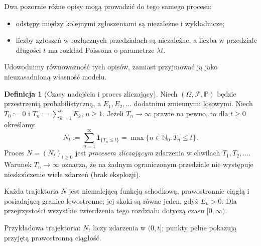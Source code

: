 \documentclass[11pt,a4paper,oneside]{report}
\numberwithin{equation}{chapter}
\theoremstyle{plain}
\theoremstyle{definition}
\newtheorem{definicja}{Definicja}[chapter]
\theoremstyle{remark}
\newcommand{\N}{\mathbb{N}}
\newcommand{\Prob}{\mathbb{P}}
\newcommand{\calF}{\mathcal{F}}
\newcommand{\ind}[1]{\mathbf{1}_{#1}}
\begin{document}
Dwa pozornie różne opisy mogą prowadzić do tego samego procesu:
\begin{itemize}
\item odstępy między kolejnymi zgłoszeniami są niezależne i wykładnicze;
\item liczby zgłoszeń w rozłącznych przedziałach są niezależne, a liczba
w przedziale długości $t$ ma rozkład Poissona o parametrze $\lambda t$.
\end{itemize}
Udowodnimy równoważność tych opisów, zamiast przyjmować ją jako
nieuzasadnioną własność modelu.

\begin{definicja}[Czasy nadejścia i proces zliczający]
Niech $(\Omega,\calF,\Prob)$ będzie przestrzenią probabilistyczną,
a $E_1,E_2,\ldots$ dodatnimi zmiennymi losowymi. Niech
$T_0:=0$ i $T_n:=\sum_{k=1}^n E_k$, $n\ge1$.
Jeżeli $T_n\to\infty$ prawie na pewno, to dla $t\ge0$ określamy
\[
N_t:=\sum_{n=1}^\infty\ind{\{T_n\le t\}}
      =\max\{n\in\N_0:T_n\le t\}.
\]
Proces $N=(N_t)_{t\ge0}$ jest \emph{procesem zliczającym} zdarzenia
w chwilach $T_1,T_2,\ldots$. Warunek $T_n\to\infty$ oznacza, że na
żadnym ograniczonym przedziale nie występuje nieskończenie wiele
zdarzeń (brak eksplozji).
\end{definicja}

Każda trajektoria $N$ jest niemalejącą funkcją schodkową, prawostronnie
ciągłą i posiadającą granice lewostronne; jej skoki są równe jeden,
gdyż $E_k>0$. Dla przejrzystości wszystkie twierdzenia tego rozdziału
dotyczą czasu $[0,\infty)$.

\begin{center}
\par\smallskip\small Przykładowa trajektoria: $N_t$ liczy zdarzenia w $(0,t]$;
punkty pełne pokazują przyjętą prawostronną ciągłość.
\end{center}
\end{document}
